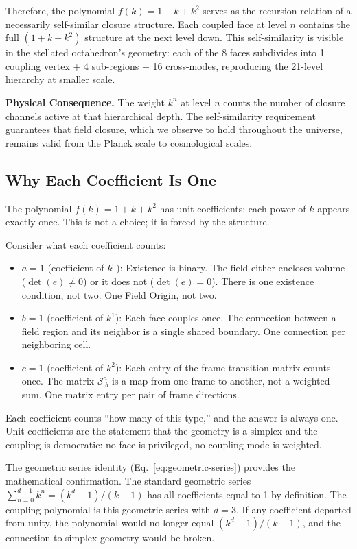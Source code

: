 \documentclass[aps,prd,preprint,superscriptaddress,showpacs,preprintnumbers,amsmath,amssymb,nofootinbib]{revtex4-2}
\begin{document}
Therefore, the polynomial $f(k) = 1 + k + k^2$ serves as the recursion relation of a necessarily self-similar closure structure. Each coupled face at level $n$ contains the full $(1 + k + k^2)$ structure at the next level down. This self-similarity is visible in the stellated octahedron's geometry: each of the 8 faces subdivides into 1 coupling vertex + 4 sub-regions + 16 cross-modes, reproducing the 21-level hierarchy at smaller scale.

\textbf{Physical Consequence.}
The weight $k^n$ at level $n$ counts the number of closure channels active at that hierarchical depth. The self-similarity requirement guarantees that field closure, which we observe to hold throughout the universe, remains valid from the Planck scale to cosmological scales.

\subsection{Why Each Coefficient Is One}
\label{subsec:coefficients}

The polynomial $f(k) = 1 + k + k^2$ has unit coefficients: each power of $k$ appears exactly once. This is not a choice; it is forced by the structure.

Consider what each coefficient counts:
\begin{itemize}
\item $a = 1$ (coefficient of $k^0$): Existence is binary. The field either encloses volume ($\det(e) \neq 0$) or it does not ($\det(e) = 0$). There is one existence condition, not two. One Field Origin, not two.
\item $b = 1$ (coefficient of $k^1$): Each face couples once. The connection between a field region and its neighbor is a single shared boundary. One connection per neighboring cell.
\item $c = 1$ (coefficient of $k^2$): Each entry of the frame transition matrix counts once. The matrix $\mathcal{S}^a_{\;b}$ is a map from one frame to another, not a weighted sum. One matrix entry per pair of frame directions.
\end{itemize}

Each coefficient counts ``how many of this type,'' and the answer is always one. Unit coefficients are the statement that the geometry is a simplex and the coupling is democratic: no face is privileged, no coupling mode is weighted.

The geometric series identity (Eq.~\ref{eq:geometric-series}) provides the mathematical confirmation. The standard geometric series $\sum_{n=0}^{d-1} k^n = (k^d - 1)/(k - 1)$ has all coefficients equal to 1 by definition. The coupling polynomial is this geometric series with $d = 3$. If any coefficient departed from unity, the polynomial would no longer equal $(k^d - 1)/(k - 1)$, and the connection to simplex geometry would be broken.
\end{document}
